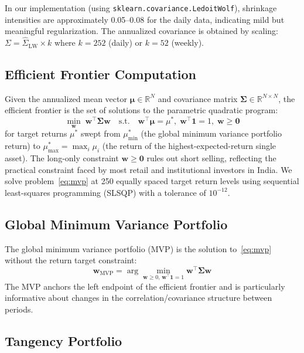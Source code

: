 \documentclass[12pt,a4paper]{article}
\begin{document}
In our implementation (using \texttt{sklearn.covariance.LedoitWolf}), shrinkage
intensities are approximately 0.05--0.08 for the daily data, indicating mild but
meaningful regularization. The annualized covariance is obtained by scaling:
$\Sigma = \hat{\Sigma}_{\text{LW}} \times k$ where $k = 252$ (daily) or $k = 52$
(weekly).

\subsection{Efficient Frontier Computation}

Given the annualized mean vector $\boldsymbol{\mu} \in \mathbb{R}^N$ and covariance
matrix $\boldsymbol{\Sigma} \in \mathbb{R}^{N \times N}$, the efficient frontier is
the set of solutions to the parametric quadratic program:
\begin{equation}
    \min_{\mathbf{w}} \; \mathbf{w}^\top \boldsymbol{\Sigma} \mathbf{w}
    \quad \text{s.t.} \quad
    \mathbf{w}^\top \boldsymbol{\mu} = \mu^*,\;
    \mathbf{w}^\top \mathbf{1} = 1,\;
    \mathbf{w} \geq \mathbf{0}
    \label{eq:mvp}
\end{equation}
for target returns $\mu^*$ swept from $\mu^*_{\min}$ (the global minimum variance
portfolio return) to $\mu^*_{\max} = \max_i \mu_i$ (the return of the highest-expected-return
single asset). The long-only constraint $\mathbf{w} \geq \mathbf{0}$ rules out short
selling, reflecting the practical constraint faced by most retail and institutional
investors in India. We solve problem~\eqref{eq:mvp} at 250 equally spaced target
return levels using sequential least-squares programming (SLSQP) with a tolerance of
$10^{-12}$.

\subsection{Global Minimum Variance Portfolio}

The global minimum variance portfolio (MVP) is the solution to~\eqref{eq:mvp} without
the return target constraint:
\begin{equation}
    \mathbf{w}_{\text{MVP}} = \arg\min_{\mathbf{w} \geq 0,\, \mathbf{w}^\top\mathbf{1}=1}
    \mathbf{w}^\top \boldsymbol{\Sigma} \mathbf{w}
\end{equation}
The MVP anchors the left endpoint of the efficient frontier and is particularly
informative about changes in the correlation/covariance structure between periods.

\subsection{Tangency Portfolio}
\end{document}
